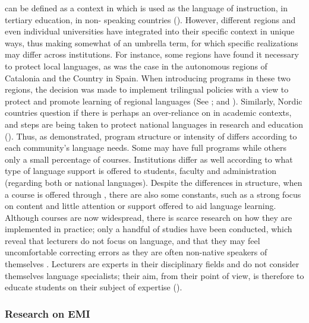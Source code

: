 \documentclass[output=paper]{langsci/langscibook}
\begin{document}
 can be defined as a context in which  is used as the language of instruction, in tertiary education, in non- speaking countries (\citealt{HellekjaerHellekjaer2015}). However, different regions and even individual universities have integrated  into their specific context in unique ways, thus making  somewhat of an umbrella term, for which specific realizations may differ across institutions. For instance, some regions have found it necessary to protect local languages, as was the case in the autonomous regions of Catalonia and the  Country in Spain. When introducing  programs in these two regions, the decision was made to implement trilingual policies with a view to protect and promote learning of regional languages (See \citealt{Pérez-Vidal2008}; and \citealt{DoizEtAl2014policy}). Similarly, Nordic countries question if there is perhaps an over-reliance on  in academic contexts, and steps are being taken to protect national languages in research and education (\citealt{NordicCouncilofMinisters2006}). Thus, as demonstrated, program structure or intensity of  differs according to each community’s language needs. Some may have full  programs while others only a small percentage of  courses. Institutions differ as well according to what type of language support is offered to students, faculty and administration (regarding both  or national languages). Despite the differences in structure, when a course is offered through , there are also some constants, such as a strong focus on content and little attention or support offered to aid language learning. Although  courses are now widespread, there is scarce research on how they are implemented in practice; only a handful of studies have been conducted, which reveal that lecturers do not focus on language, and that they may feel uncomfortable correcting errors as they are often non-native speakers of  themselves \citep{Costa2012}. Lecturers are experts in their disciplinary fields and do not consider themselves language specialists; their aim, from their point of view, is therefore to educate students on their subject of expertise (\citealt{Airey2012,Unterberger2012}).


\subsubsection{Research on EMI}
\end{document}

